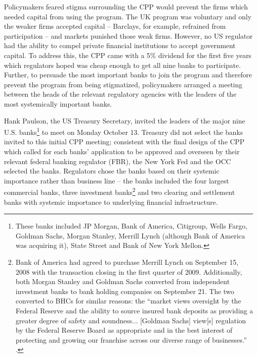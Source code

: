 \documentclass[12pt]{article}
\begin{document}
Policymakers feared stigma surrounding the CPP would prevent the firms which needed capital from using the program. The UK program was voluntary and only the weaker firms accepted capital -- Barclays, for example, refrained from participation -- and markets punished those weak firms. However, no US regulator had the ability to compel private financial institutions to accept government capital. To address this, the CPP came with a 5\% dividend for the first five years which regulators hoped was cheap enough to get all nine banks to participate. Further, to persuade the most important banks to join the program and therefore prevent the program from being stigmatized, policymakers arranged a meeting between the heads of the relevant regulatory agencies with the leaders of the most systemically important banks.  

Hank Paulson, the US Treasury Secretary, invited the leaders of the major nine U.S. banks\footnote{These banks included JP Morgan, Bank of America, Citigroup, Wells Fargo, Goldman Sachs, Morgan Stanley, Merrill Lynch (although Bank of America was acquiring it), State Street and Bank of New York Mellon.} to meet on Monday October 13. Treasury did not select the banks invited to this initial CPP meeting; consistent with the final design of the CPP which called for each banks' application to be approved and overseen by their relevant federal banking regulator (FBR), the New York Fed and the OCC selected the banks. Regulators chose the banks based on their systemic importance rather than business line -- the banks included the four largest commercial banks, three investment banks\footnote{Bank of America had  agreed to purchase Merrill Lynch on September 15, 2008 with the transaction closing in the first quarter of 2009. Additionally, both Morgan Stanley and Goldman Sachs converted from independent investment banks to bank holding companies on September 21. The two converted to BHCs for similar reasons: the ``market views oversight by the Federal Reserve and the ability to source insured bank deposits as providing a greater degree of safety and soundness... [Goldman Sachs] view[s] regulation by the Federal Reserve Board as appropriate and in the best interest of protecting and growing our franchise across our diverse range of businesses.'' \citep{GSBHC}.} and two clearing and settlement banks with systemic importance to underlying financial infrastructure.  
\end{document}
